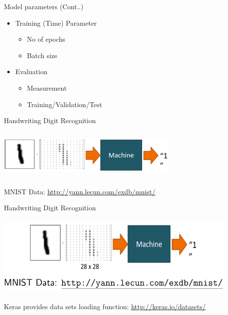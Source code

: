 \documentclass[aspectratio=169,14pt,usenames,dvipsnames]{beamer}
\begin{document}
\begin{frame}{Model parameters (Cont..)}
\begin{itemize}
\item Training (Time) Parameter
\begin{itemize}
\item No of epochs
\item Batch size
\end{itemize}
\end{itemize}

\begin{itemize}
\item Evaluation
\begin{itemize}
\item Measurement
\item Training/Validation/Test
\end{itemize}
\end{itemize}

\end{frame}

\begin{frame}{Handwriting Digit Recognition}
\begin{center}
\includegraphics[width=9cm, height=2.5cm]{Keras_Images/Ker_5.png} \\
\item<2-> MNIST Data: \underline{\url{http://yann.lecun.com/exdb/mnist/}}\\
\end{center}
\end{frame}


\begin{frame}{Handwriting Digit Recognition}
\begin{center}
\includegraphics[width=12cm, height=4cm]{Keras_Images/Ker_6.png} \\
\item<2-> Keras provides data sets loading function: \underline{\url{http://keras.io/datasets/}}\\
\end{center}
\end{frame}
\end{document}
